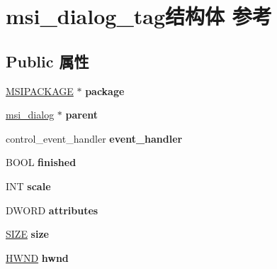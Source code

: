 \hypertarget{structmsi__dialog__tag}{}\section{msi\+\_\+dialog\+\_\+tag结构体 参考}
\label{structmsi__dialog__tag}
\subsection*{Public 属性}
\begin{DoxyCompactItemize}
\item 
\mbox{\label{structmsi__dialog__tag_a607223cf3c4f451ed9e66de41edada5a}} 
\hyperlink{structtag_m_s_i_p_a_c_k_a_g_e}{M\+S\+I\+P\+A\+C\+K\+A\+GE} $\ast$ {\bfseries package}
\item 
\mbox{\label{structmsi__dialog__tag_a1644b5e8ae0763e2f7b7352bbaf79f0f}} 
\hyperlink{structmsi__dialog__tag}{msi\+\_\+dialog} $\ast$ {\bfseries parent}
\item 
\mbox{\label{structmsi__dialog__tag_a6a0be7006b387523f36f4440ecb295a7}} 
control\+\_\+event\+\_\+handler {\bfseries event\+\_\+handler}
\item 
\mbox{\label{structmsi__dialog__tag_a5d7da985dfa467b4d9e63fb43e5d04ac}} 
B\+O\+OL {\bfseries finished}
\item 
\mbox{\label{structmsi__dialog__tag_af811596cf17f8cae3465ed554d2f134b}} 
I\+NT {\bfseries scale}
\item 
\mbox{\label{structmsi__dialog__tag_a81afdef5084e585913c488b9d21de545}} 
D\+W\+O\+RD {\bfseries attributes}
\item 
\mbox{\label{structmsi__dialog__tag_aba2ee32dd9d497c29c7587add0849fa5}} 
\hyperlink{structtag_s_i_z_e}{S\+I\+ZE} {\bfseries size}
\item 
\mbox{\label{structmsi__dialog__tag_a68377ded8b1a996c948f6afff13c0940}} 
\hyperlink{interfacevoid}{H\+W\+ND} {\bfseries hwnd}
\item 
\mbox{\label{structmsi__dialog__tag_a22017d7ffaacb47e810e008303091df1}} 

\end{DoxyCompactItemize}
